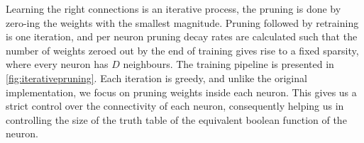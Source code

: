 Learning the right connections is an iterative process, the pruning is done by zero-ing the weights with the smallest magnitude. Pruning followed by retraining is one iteration, and per neuron pruning decay rates are calculated such that the number of weights zeroed out by the end of training gives rise to a fixed sparsity, where every neuron has $D$ neighbours. The training pipeline is presented in \cref{fig:iterativepruning}. Each iteration is greedy, and unlike the original implementation, we focus on pruning weights inside each neuron. This gives us a strict control over the connectivity of each neuron, consequently helping us in controlling the size of the truth table of the equivalent boolean function of the neuron. 

